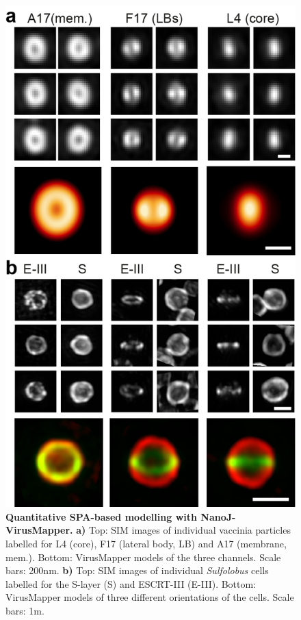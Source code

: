 \begin{figure}[!t]
    \centering
    \includegraphics{Figures/FigureVirusMapper_v1.png}
    \caption{\textbf{Quantitative SPA-based modelling with NanoJ-VirusMapper.} \textbf{a)} Top: SIM images of individual vaccinia particles labelled for L4 (core), F17 (lateral body, LB) and A17 (membrane, mem.). Bottom: VirusMapper models of the three channels. Scale bars: 200nm. \textbf{b)} Top: SIM images of individual \emph{Sulfolobus} cells labelled for the S-layer (S) and ESCRT-III (E-III). Bottom: VirusMapper models of three different orientations of the cells. Scale bars: 1\micro m. }
    \label{fig:VirusMapper}
\end{figure}


